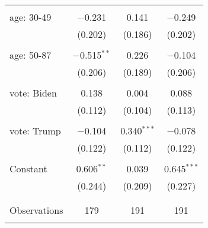 \begin{tabular}{@{\extracolsep{5pt}}lccc}
  & & & \\ 
 age: 30-49 & $-$0.231 & 0.141 & $-$0.249 \\ 
  & (0.202) & (0.186) & (0.202) \\ 
  & & & \\ 
 age: 50-87 & $-$0.515$^{**}$ & 0.226 & $-$0.104 \\ 
  & (0.206) & (0.189) & (0.206) \\ 
  & & & \\ 
 vote: Biden & 0.138 & 0.004 & 0.088 \\ 
  & (0.112) & (0.104) & (0.113) \\ 
  & & & \\ 
 vote: Trump & $-$0.104 & 0.340$^{***}$ & $-$0.078 \\ 
  & (0.122) & (0.112) & (0.122) \\ 
  & & & \\ 
 Constant & 0.606$^{**}$ & 0.039 & 0.645$^{***}$ \\ 
  & (0.244) & (0.209) & (0.227) \\ 
  & & & \\ 
\hline \\[-1.8ex] 

Observations & 179 & 191 & 191 \\ 
\hline 
\hline \\[-1.8ex] 
\end{tabular} 